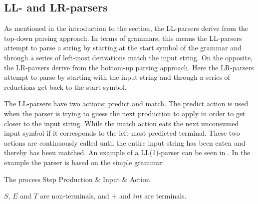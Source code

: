 \subsection{LL- and LR-parsers}
\label{subsec:llparsersandlrparsers}
As mentioned in the introduction to the section, the LL-parsers derive from the
top-down parsing approach. In terms of grammars, this means the LL-parsers
attempt to parse a string by starting at the start symbol of the grammar and
through a series of left-most derivations match the input string. On the
opposite, the LR-parsers derive from the bottom-up parsing approach. Here the
LR-parsers attempt to parse by starting with the input string and through a
series of reductions get back to the start symbol.

The LL-parsers have two
actions; predict and match. The predict action is used when the parser is trying
to guess the next production to apply in order to get closer to the input
string. While the match action eats the next unconsumed input symbol if it
corresponds to the left-most predicted terminal. These two actions are
continuously called until the entire input string has been eaten and thereby has
been matched. An example of a LL(1)-parser can be seen in
. In the example the parser is based on the simple grammar: 

\begin{centering}
\begin{ebnf}
\end{ebnf}
\end{centering}

	      {The process                                          }
{Step  	 }{Production & Input       & Action                        }{
}

$S$, $E$ and $T$ are non-terminals, and $+$ and $int$ are terminals. 

